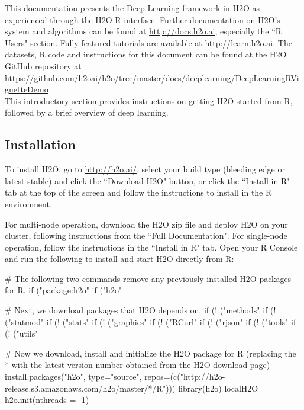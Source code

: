 \documentclass{article}[11pt]
\begin{document}
This documentation presents the Deep Learning framework in H2O as experienced through the H2O R interface. Further documentation on H2O's system and algorithms can be found at {\url{http://docs.h2o.ai}}, especially the ``R Users" section. Fully-featured tutorials are available at {\url{http://learn.h2o.ai}}. The datasets, R code and instructions for this document can be found at the H2O GitHub repository at  {\url{https://github.com/h2oai/h2o/tree/master/docs/deeplearning/DeepLearningRVignetteDemo}}\\%
This introductory section provides instructions on getting H2O started from R, followed by a brief overview of deep learning.

\subsection{Installation} 

To install H2O, go to {\url{http://h2o.ai/}}, select your build type (bleeding edge or latest stable) and click the ``Download H2O" button, or click the ``Install in R" tab at the top of the screen and follow the instructions to install in the R environment. 

For multi-node operation, download the H2O zip file and deploy H2O on your cluster, following instructions from the ``Full Documentation". For single-node operation, follow the instructions in the ``Install in R" tab. Open your R Console and run the following to install and start H2O directly from R:

\footnotesize %
\begin{spverbatim}
# The following two commands remove any previously installed H2O packages for R.
if ("package:h2o" %
if ("h2o" %

# Next, we download packages that H2O depends on.
if (! ("methods" %
if (! ("statmod" %
if (! ("stats" %
if (! ("graphics" %
if (! ("RCurl" %
if (! ("rjson" %
if (! ("tools" %
if (! ("utils" %
\end{spverbatim}
\begin{spverbatim}
# Now we download, install and initialize the H2O package for R (replacing
the * with the latest version number obtained from the H2O download page)
install.packages("h2o", type="source", repos=(c("http://h2o-release.s3.amazonaws.com/h2o/master/*/R")))
library(h2o)
localH2O = h2o.init(nthreads = -1)
\end{spverbatim}
\normalsize%
\end{document}
